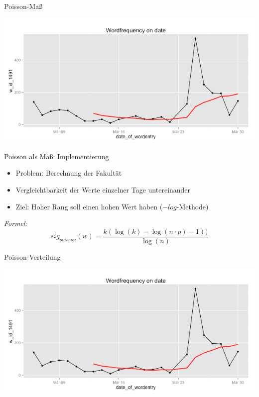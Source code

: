 \documentclass{beamer}
\begin{document}
\begin{frame}{Poisson-Maß}
	\hspace{2cm}
	  \begin{centering}
	  \includegraphics[width=1\textwidth]{pictures/freqratioFlugzeug.png}
	\end{centering}
\end{frame}

\begin{frame}{Poisson als Ma\ss : Implementierung}
	\begin{itemize}
 		\item Problem: Berechnung der Fakult\"at
 		\item Vergleichtbarkeit der Werte einzelner Tage untereinander 
 		\item Ziel: Hoher Rang soll einen hohen Wert haben ($-log$-Methode)
	 \end{itemize}
	 \emph{Formel:}
	 \begin{equation}
		sig_{poisson}(w) = \frac{k(\log(k)-\log(n\cdot p) -1 ))}{\log(n)}
	\end{equation}
\end{frame}

\begin{frame}{Poisson-Verteilung}
	\hspace{1cm}
	  \begin{centering}
	  \includegraphics[width=1\textwidth]{pictures/freqratioFlugzeug.png}
	\end{centering}
\end{frame}
\end{document}
